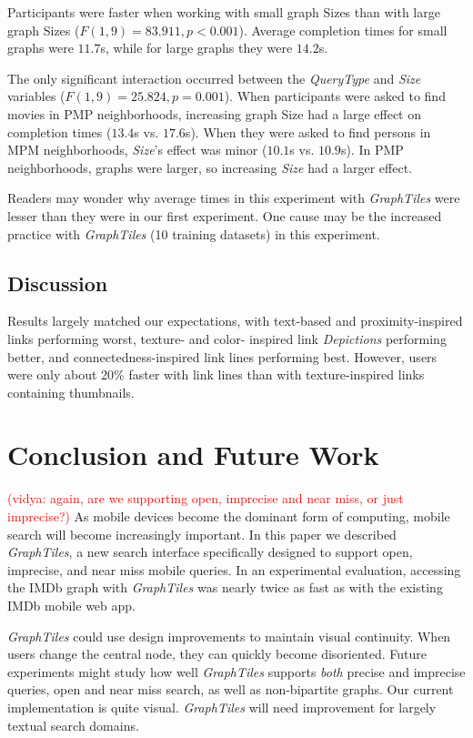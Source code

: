 \documentclass{sigchi}
\newcommand{\vidya}[1]{\textcolor{red}{(vidya: #1)}}
\begin{document}
Participants were faster when working with small graph Sizes than with large graph Sizes ($F(1,9)=83.911, p<0.001$). Average completion times for small graphs were $11.7$s, while for large graphs they were $14.2$s.

The only significant interaction occurred between the \textit{QueryType} and \textit{Size} variables ($F(1,9)=25.824, p=0.001$). When participants were asked to find movies in PMP neighborhoods, increasing graph Size had a large effect on completion times ($13.4$s vs. $17.6$s). When they were asked to find persons in MPM neighborhoods, \textit{Size}'s effect was minor ($10.1$s vs. $10.9$s). In PMP neighborhoods, graphs were larger, so increasing \textit{Size} had a larger effect.

Readers may wonder why average times in this experiment with \textit{GraphTiles} were lesser than they were in our first experiment. One cause may be the increased practice with \textit{GraphTiles} (10 training datasets) in this experiment.


\subsection{Discussion}
Results largely matched our expectations, with text-based and proximity-inspired links performing worst, texture- and color- inspired link \textit{Depictions} performing better, and connectedness-inspired link lines performing best. However, users were only about 20\% faster with link lines than with texture-inspired links containing thumbnails.



\section{Conclusion and Future Work}
\vidya{again, are we supporting open, imprecise and near miss, or just imprecise?}
As mobile devices become the dominant form of computing, mobile search will become increasingly important. In this paper we described \textit{GraphTiles}, a new search interface specifically designed to support open, imprecise, and near miss mobile queries. In an experimental evaluation, accessing the IMDb graph with \textit{GraphTiles} was nearly twice as fast as with the existing IMDb mobile web app.

\textit{GraphTiles} could use design improvements to maintain visual continuity. When users change the central node, they can quickly become disoriented. Future experiments might study how well \textit{GraphTiles} supports \textit{both} precise and imprecise queries, open and near miss search, as well as non-bipartite graphs. Our current implementation is quite visual. \textit{GraphTiles} will need improvement for largely textual search domains. 
\end{document}
